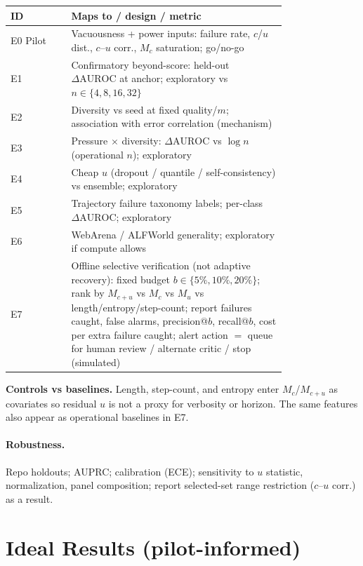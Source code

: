\documentclass[11pt]{article}
\newcommand{\DeltaAUROC}{\Delta\mathrm{AUROC}}
\begin{document}
\begin{table}[h]
\centering\footnotesize
\begin{tabular}{@{}lp{0.78\linewidth}@{}}
\toprule
\textbf{ID} & \textbf{Maps to / design / metric} \\
\midrule
E0 Pilot
& Vacuousness + power inputs: failure rate, $c$/$u$ dist., $c$--$u$ corr., $M_c$ saturation; go/no-go \\
E1
& Confirmatory beyond-score: held-out $\DeltaAUROC$ at anchor; exploratory vs $n\in\{4,8,16,32\}$ \\
E2
& Diversity vs seed at fixed quality/$m$; association with error correlation (mechanism) \\
E3
& Pressure $\times$ diversity: $\DeltaAUROC$ vs $\log n$ (operational $n$); exploratory \\
E4
& Cheap $u$ (dropout / quantile / self-consistency) vs ensemble; exploratory \\
E5
& Trajectory failure taxonomy labels; per-class $\DeltaAUROC$; exploratory \\
E6
& WebArena / ALFWorld generality; exploratory if compute allows \\
E7
& Offline selective verification (not adaptive recovery): fixed budget $b\in\{5\%,10\%,20\%\}$;
  rank by $M_{c{+}u}$ vs $M_c$ vs $M_u$ vs length/entropy/step-count;
  report failures caught, false alarms, precision@$b$, recall@$b$, cost per extra failure caught;
  alert action $=$ queue for human review / alternate critic / stop (simulated) \\
\bottomrule
\end{tabular}
\end{table}

\noindent\textbf{Controls vs baselines.}
Length, step-count, and entropy enter $M_c$/$M_{c{+}u}$ as covariates so residual $u$ is not a proxy for verbosity or horizon.
The same features also appear as operational baselines in E7.

\paragraph{Robustness.}
Repo holdouts; AUPRC; calibration (ECE); sensitivity to $u$ statistic, normalization, panel composition; report selected-set range restriction ($c$--$u$ corr.) as a result.

\section{Ideal Results (pilot-informed)}
\end{document}
